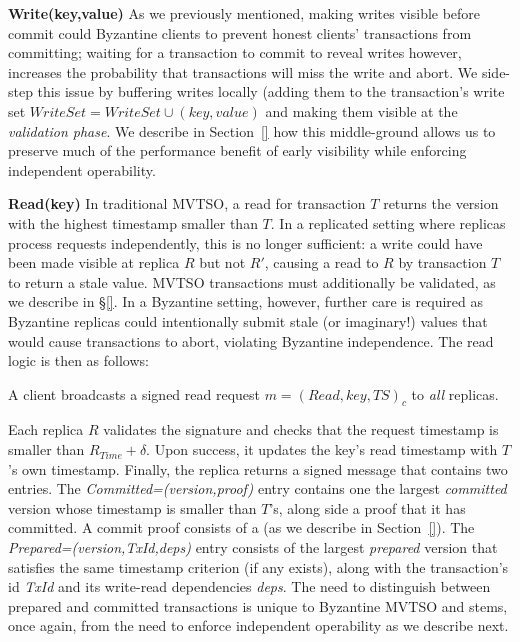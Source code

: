 \par \textbf{Write(key,value)} As we previously mentioned, making writes visible before commit could Byzantine clients to prevent honest clients' transactions from committing; waiting for a transaction to commit to reveal writes however, increases the probability that transactions will miss the write and abort.  We side-step this issue by buffering writes locally (adding them to the transaction's write set $WriteSet = WriteSet \cup(key,value)$ and making them visible at the \textit{validation phase}. We describe in Section~\ref{}
how this middle-ground allows us to preserve
much of the performance benefit of early visibility while enforcing independent operability.

\par \textbf{Read(key)} In traditional MVTSO, a read for transaction $T$ returns the version with the highest timestamp smaller than $T$. In a replicated setting where replicas process requests independently, this is no longer sufficient: a write could have been made visible at replica $R$ but not $R'$, causing a read to $R$ by transaction $T$ to return a stale value. MVTSO transactions must additionally be validated, as we describe in \S\ref{}. In a Byzantine
setting, however, further care is required as Byzantine replicas could intentionally submit stale (or imaginary!) values that would cause transactions to abort, violating Byzantine independence. The read logic is then as follows:


A client broadcasts a signed read request  $m = (Read, key, TS)_c$ to \textit{all} replicas.


Each replica $R$ validates the signature and checks that the request timestamp is smaller than $R_{Time} + \delta$. Upon success, it updates the key's read timestamp with $T$'s own timestamp. Finally, the replica returns a signed message  that contains two entries.
The \textit{Committed=(version,proof)} entry contains one the largest \textit{committed} version whose timestamp is smaller than $T$'s, along side a proof that it has committed. A commit proof consists of a  (as we describe in Section~\ref{}). The \textit{Prepared=(version,TxId,deps)} entry consists of the largest \textit{prepared} version that satisfies the same timestamp criterion (if any exists), along with the transaction's id \textit{TxId} and its write-read dependencies \textit{deps}.
The need to distinguish between prepared and committed transactions is unique to Byzantine MVTSO and stems, once again, from the need to enforce independent operability as we describe next.

